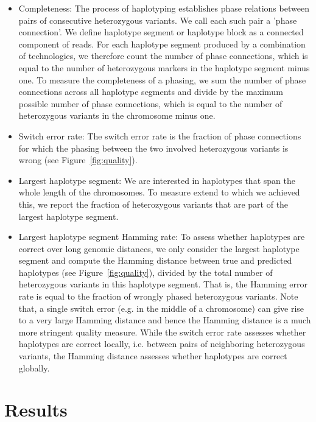 \begin{itemize}
 \item Completeness: The process of haplotyping establishes phase relations between pairs of consecutive heterozygous variants. We call each such pair a 'phase connection'. 
 We define haplotype segment or haplotype block as a connected component of reads. For each haplotype segment produced by a combination of technologies, we therefore count the number of phase connections, which is equal to the number of heterozygous markers in the haplotype segment minus one. 
To measure the completeness of a phasing, we sum the number of phase connections across all haplotype segments and divide by the maximum possible number of phase connections, which is equal to the number of heterozygous variants in the chromosome minus one.
\item Switch error rate: The switch error rate is the fraction of phase connections for which the phasing between the two involved heterozygous variants is wrong (see Figure~\ref{fig:quality}).
\item Largest haplotype segment: We are interested in haplotypes that span the whole length of the chromosomes. To measure extend to which we achieved this, we report the fraction of heterozygous variants that are part of the largest haplotype segment.
\vspace{10cm}
\item Largest haplotype segment Hamming rate: To assess whether haplotypes are correct over long genomic distances, we only consider the largest haplotype segment and compute the Hamming distance between true and predicted haplotypes (see Figure~\ref{fig:quality}),
divided by the total number of heterozygous variants in this haplotype segment. 
That is, the Hamming error rate is equal to the fraction of wrongly phased heterozygous variants. 
Note that, a single switch error (e.g. in the middle of a chromosome) can give rise to a very large Hamming distance and hence the Hamming distance is a much more stringent quality measure. 
While the switch error rate assesses whether haplotypes are correct locally, i.e. between pairs of neighboring heterozygous variants, the Hamming distance assesses whether haplotypes are correct globally.
\end{itemize}

\section{Results}
